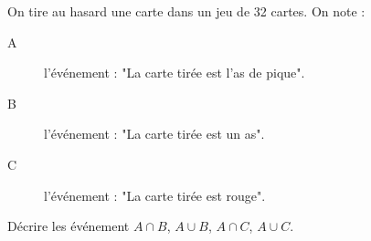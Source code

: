 
On tire au hasard une carte dans un jeu de 32 cartes. On note :
\begin{description}
\item[A] l'événement : "La carte tirée est l'as de pique".
\item[B] l'événement : "La carte tirée est un as".
\item[C] l'événement : "La carte tirée est rouge".
\end{description}
Décrire les événement $A \cap B$, $A \cup B$, $A \cap C$, $A \cup C$.
 